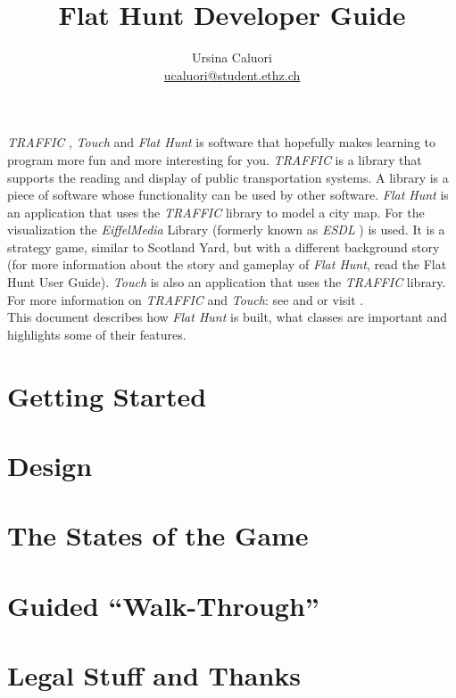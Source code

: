 \documentclass[a4paper,titlepage,12pt]{article}
\title{\textbf{Flat Hunt Developer Guide}}
\author{Ursina Caluori\\ \href{mailto: ucaluori@student.ethz.ch}{ucaluori@student.ethz.ch}}
\begin{document}
  \maketitle
  \tableofcontents
  \pagebreak

  \paragraph{}
  \emph{TRAFFIC} \cite{sa05}, \emph{Touch} \cite{rk05} and \emph{Flat Hunt} is software that hopefully makes learning to program more fun and more interesting for you. \emph{TRAFFIC} is a library that supports the reading and display of public transportation systems. A library is a piece of software whose functionality can be used by other software. \emph{Flat Hunt} is an application that uses the \emph{TRAFFIC} library to model a city map. For the visualization the \emph{EiffelMedia} Library (formerly known as \emph{ESDL} \cite{tgb03}\cite{bb04}) is used. It is a strategy game, similar to Scotland Yard, but with a different background story (for more information about the story and gameplay of \emph{Flat Hunt}, read the Flat Hunt User Guide). \emph{Touch} is also an application that uses the \emph{TRAFFIC} library. For more information on \emph{TRAFFIC} and \emph{Touch}: see \cite{sa05} and \cite{rk05} or visit .\\

  This document describes how \emph{Flat Hunt} is built, what classes are important and highlights some of their features.
  
  \section{Getting Started}
    
  \section{Design}
    
  \section{The States of the Game}
     
  \section{Guided ``Walk-Through''}
    
  \section{Legal Stuff and Thanks}
    
    
    
\end{document}

